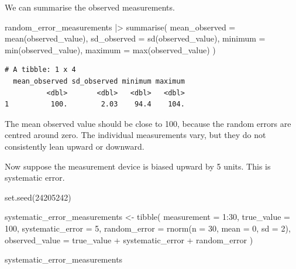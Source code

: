 \documentclass[
  letterpaper,
  DIV=11,
  numbers=noendperiod]{scrreprt}
\newenvironment{Shaded}{\begin{snugshade}}{\end{snugshade}}
\newcommand{\AttributeTok}[1]{\textcolor[rgb]{0.40,0.45,0.13}{#1}}
\newcommand{\DecValTok}[1]{\textcolor[rgb]{0.68,0.00,0.00}{#1}}
\newcommand{\FunctionTok}[1]{\textcolor[rgb]{0.28,0.35,0.67}{#1}}
\newcommand{\NormalTok}[1]{\textcolor[rgb]{0.00,0.23,0.31}{#1}}
\newcommand{\OtherTok}[1]{\textcolor[rgb]{0.00,0.23,0.31}{#1}}
\newcommand{\SpecialCharTok}[1]{\textcolor[rgb]{0.37,0.37,0.37}{#1}}
\begin{document}
We can summarise the observed measurements.

\begin{Shaded}
\begin{Highlighting}[]
\NormalTok{random\_error\_measurements }\SpecialCharTok{|\textgreater{}}
  \FunctionTok{summarise}\NormalTok{(}
    \AttributeTok{mean\_observed =} \FunctionTok{mean}\NormalTok{(observed\_value),}
    \AttributeTok{sd\_observed =} \FunctionTok{sd}\NormalTok{(observed\_value),}
    \AttributeTok{minimum =} \FunctionTok{min}\NormalTok{(observed\_value),}
    \AttributeTok{maximum =} \FunctionTok{max}\NormalTok{(observed\_value)}
\NormalTok{  )}
\end{Highlighting}
\end{Shaded}

\begin{verbatim}
# A tibble: 1 x 4
  mean_observed sd_observed minimum maximum
          <dbl>       <dbl>   <dbl>   <dbl>
1          100.        2.03    94.4    104.
\end{verbatim}

The mean observed value should be close to 100, because the random
errors are centred around zero. The individual measurements vary, but
they do not consistently lean upward or downward.

Now suppose the measurement device is biased upward by 5 units. This is
systematic error.

\begin{Shaded}
\begin{Highlighting}[]
\FunctionTok{set.seed}\NormalTok{(}\DecValTok{24205242}\NormalTok{)}

\NormalTok{systematic\_error\_measurements }\OtherTok{\textless{}{-}} \FunctionTok{tibble}\NormalTok{(}
  \AttributeTok{measurement =} \DecValTok{1}\SpecialCharTok{:}\DecValTok{30}\NormalTok{,}
  \AttributeTok{true\_value =} \DecValTok{100}\NormalTok{,}
  \AttributeTok{systematic\_error =} \DecValTok{5}\NormalTok{,}
  \AttributeTok{random\_error =} \FunctionTok{rnorm}\NormalTok{(}\AttributeTok{n =} \DecValTok{30}\NormalTok{, }\AttributeTok{mean =} \DecValTok{0}\NormalTok{, }\AttributeTok{sd =} \DecValTok{2}\NormalTok{),}
  \AttributeTok{observed\_value =}\NormalTok{ true\_value }\SpecialCharTok{+}\NormalTok{ systematic\_error }\SpecialCharTok{+}\NormalTok{ random\_error}
\NormalTok{)}

\NormalTok{systematic\_error\_measurements}
\end{Highlighting}
\end{Shaded}
\end{document}
